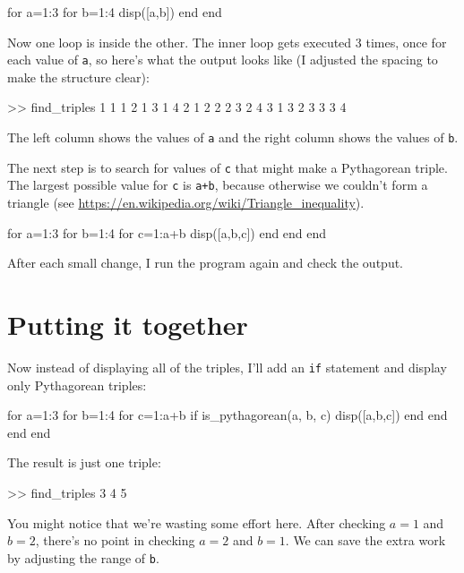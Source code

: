 \begin{code}
for a=1:3
    for b=1:4
        disp([a,b])
    end
end
\end{code}

Now one loop is inside the other.  The inner loop gets executed 3 times, once for each value of {\tt a}, so here's what the output looks like (I adjusted the spacing to make
the structure clear):

\begin{code}
>> find_triples
     1     1
     1     2
     1     3
     1     4
     2     1
     2     2
     2     3
     2     4
     3     1
     3     2
     3     3
     3     4
\end{code}

The left column shows the values of {\tt a} and the right column shows the values of {\tt b}.

The next step is to search for values of {\tt c} that might make a Pythagorean triple.  The largest possible value for {\tt c} is {\tt a+b}, because otherwise we couldn't form a triangle 
(see \url{https://en.wikipedia.org/wiki/Triangle_inequality}).

\begin{code}
for a=1:3
    for b=1:4
        for c=1:a+b
            disp([a,b,c])
        end
    end
end
\end{code}

After each small change, I run the program again and check the output.

\section{Putting it together}

Now instead of displaying all of the triples, I'll add an {\tt if} statement and display only Pythagorean triples:

\begin{code}
for a=1:3
    for b=1:4
        for c=1:a+b
            if is_pythagorean(a, b, c)
                disp([a,b,c])
            end
        end
    end
end
\end{code}

The result is just one triple:

\begin{code}
>> find_triples
     3     4     5
\end{code}

You might notice that we're wasting some effort here.
After checking $a=1$ and $b=2$, there's no point in checking
$a=2$ and $b=1$.  We can save the extra work by adjusting the
range of {\tt b}.

